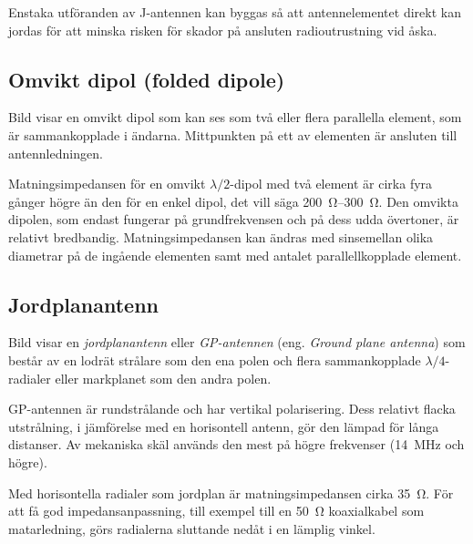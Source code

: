 Enstaka utföranden av J-antennen kan byggas så att antennelementet direkt kan
jordas för att minska risken för skador på ansluten radioutrustning vid åska.


\subsection{Omvikt dipol (folded dipole)}

Bild  visar en omvikt dipol som kan ses som två eller flera
parallella element, som är sammankopplade i ändarna.
Mittpunkten på ett av elementen är ansluten till antennledningen.

Matningsimpedansen för en omvikt \(\lambda/2\)-dipol med två element är
cirka fyra gånger högre än den för en enkel dipol, det vill säga
\SIrange{200}{300}{\ohm}.
Den omvikta dipolen, som endast fungerar på grundfrekvensen och på
dess udda övertoner, är relativt bredbandig.
Matningsimpedansen kan ändras med sinsemellan olika diametrar på de ingående
elementen samt med antalet parallellkopplade element.


\subsection{Jordplanantenn}
\label{jordplanantenn}

Bild  visar en \emph{jordplanantenn} eller
\emph{GP-antennen} (eng. \emph{Ground plane antenna}) som består av en
lodrät strålare som den ena polen och flera sammankopplade
\(\lambda/4\)-radialer eller markplanet som den andra polen.

GP-antennen är rundstrålande och har vertikal polarisering.
Dess relativt flacka utstrålning, i jämförelse med en horisontell antenn,
gör den lämpad för långa distanser.
Av mekaniska skäl används den mest på högre frekvenser (\SI{14}{\mega\hertz}
och högre).

Med horisontella radialer som jordplan är matningsimpedansen cirka
\SI{35}{\ohm}.
För att få god impedansanpassning, till exempel till en \SI{50}{\ohm}
koaxialkabel som matarledning, görs radialerna sluttande nedåt i en lämplig
vinkel.

